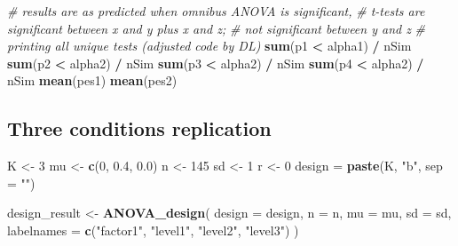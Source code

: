 \documentclass[]{book}
\newenvironment{Shaded}{\begin{snugshade}}{\end{snugshade}}
\newcommand{\CommentTok}[1]{\textcolor[rgb]{0.56,0.35,0.01}{\textit{#1}}}
\newcommand{\DataTypeTok}[1]{\textcolor[rgb]{0.13,0.29,0.53}{#1}}
\newcommand{\DecValTok}[1]{\textcolor[rgb]{0.00,0.00,0.81}{#1}}
\newcommand{\FloatTok}[1]{\textcolor[rgb]{0.00,0.00,0.81}{#1}}
\newcommand{\KeywordTok}[1]{\textcolor[rgb]{0.13,0.29,0.53}{\textbf{#1}}}
\newcommand{\NormalTok}[1]{#1}
\newcommand{\OperatorTok}[1]{\textcolor[rgb]{0.81,0.36,0.00}{\textbf{#1}}}
\newcommand{\StringTok}[1]{\textcolor[rgb]{0.31,0.60,0.02}{#1}}
\begin{document}
\begin{Shaded}
\begin{Highlighting}[]
\CommentTok{# results are as predicted when omnibus ANOVA is significant, }
\CommentTok{# t-tests are significant between x and y plus x and z; }
\CommentTok{# not significant between y and z}
\CommentTok{# printing all unique tests (adjusted code by DL)}
\KeywordTok{sum}\NormalTok{(p1 }\OperatorTok{<}\StringTok{ }\NormalTok{alpha1) }\OperatorTok{/}\StringTok{ }\NormalTok{nSim}
\KeywordTok{sum}\NormalTok{(p2 }\OperatorTok{<}\StringTok{ }\NormalTok{alpha2) }\OperatorTok{/}\StringTok{ }\NormalTok{nSim}
\KeywordTok{sum}\NormalTok{(p3 }\OperatorTok{<}\StringTok{ }\NormalTok{alpha2) }\OperatorTok{/}\StringTok{ }\NormalTok{nSim}
\KeywordTok{sum}\NormalTok{(p4 }\OperatorTok{<}\StringTok{ }\NormalTok{alpha2) }\OperatorTok{/}\StringTok{ }\NormalTok{nSim}
\KeywordTok{mean}\NormalTok{(pes1)}
\KeywordTok{mean}\NormalTok{(pes2)}
\end{Highlighting}
\end{Shaded}

\hypertarget{three-conditions-replication-1}{%
\subsection{Three conditions replication}\label{three-conditions-replication-1}}

\begin{Shaded}
\begin{Highlighting}[]
\NormalTok{K <-}\StringTok{ }\DecValTok{3}
\NormalTok{mu <-}\StringTok{ }\KeywordTok{c}\NormalTok{(}\DecValTok{0}\NormalTok{, }\FloatTok{0.4}\NormalTok{, }\FloatTok{0.0}\NormalTok{)}
\NormalTok{n <-}\StringTok{ }\DecValTok{145}
\NormalTok{sd <-}\StringTok{ }\DecValTok{1}
\NormalTok{r <-}\StringTok{ }\DecValTok{0}
\NormalTok{design =}\StringTok{ }\KeywordTok{paste}\NormalTok{(K, }\StringTok{"b"}\NormalTok{, }\DataTypeTok{sep =} \StringTok{""}\NormalTok{)}
\end{Highlighting}
\end{Shaded}

\begin{Shaded}
\begin{Highlighting}[]
\NormalTok{design_result <-}\StringTok{ }\KeywordTok{ANOVA_design}\NormalTok{(}
  \DataTypeTok{design =}\NormalTok{ design,}
  \DataTypeTok{n =}\NormalTok{ n,}
  \DataTypeTok{mu =}\NormalTok{ mu,}
  \DataTypeTok{sd =}\NormalTok{ sd,}
  \DataTypeTok{labelnames =} \KeywordTok{c}\NormalTok{(}\StringTok{"factor1"}\NormalTok{, }\StringTok{"level1"}\NormalTok{, }\StringTok{"level2"}\NormalTok{, }\StringTok{"level3"}\NormalTok{)}
\NormalTok{  )}
\end{Highlighting}
\end{Shaded}
\end{document}
